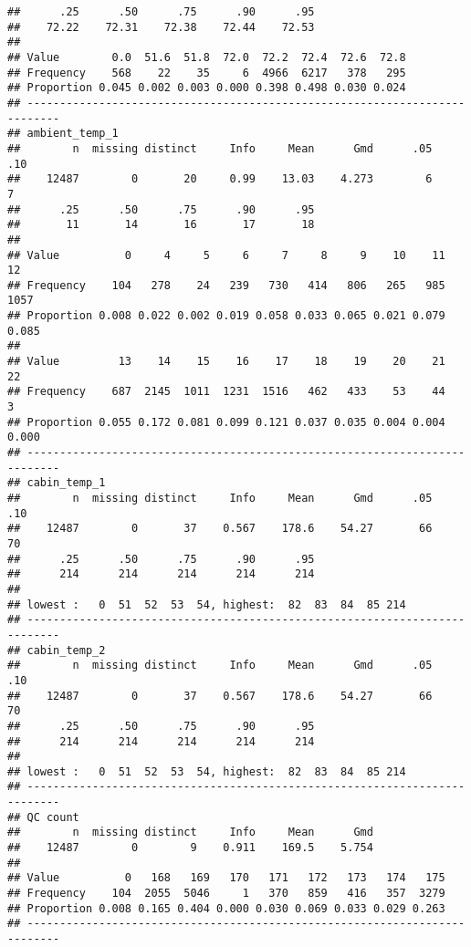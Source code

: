 \documentclass[]{article}
\begin{document}
\begin{verbatim}
##      .25      .50      .75      .90      .95 
##    72.22    72.31    72.38    72.44    72.53 
##                                                           
## Value        0.0  51.6  51.8  72.0  72.2  72.4  72.6  72.8
## Frequency    568    22    35     6  4966  6217   378   295
## Proportion 0.045 0.002 0.003 0.000 0.398 0.498 0.030 0.024
## ---------------------------------------------------------------------------
## ambient_temp_1 
##        n  missing distinct     Info     Mean      Gmd      .05      .10 
##    12487        0       20     0.99    13.03    4.273        6        7 
##      .25      .50      .75      .90      .95 
##       11       14       16       17       18 
##                                                                       
## Value          0     4     5     6     7     8     9    10    11    12
## Frequency    104   278    24   239   730   414   806   265   985  1057
## Proportion 0.008 0.022 0.002 0.019 0.058 0.033 0.065 0.021 0.079 0.085
##                                                                       
## Value         13    14    15    16    17    18    19    20    21    22
## Frequency    687  2145  1011  1231  1516   462   433    53    44     3
## Proportion 0.055 0.172 0.081 0.099 0.121 0.037 0.035 0.004 0.004 0.000
## ---------------------------------------------------------------------------
## cabin_temp_1 
##        n  missing distinct     Info     Mean      Gmd      .05      .10 
##    12487        0       37    0.567    178.6    54.27       66       70 
##      .25      .50      .75      .90      .95 
##      214      214      214      214      214 
## 
## lowest :   0  51  52  53  54, highest:  82  83  84  85 214
## ---------------------------------------------------------------------------
## cabin_temp_2 
##        n  missing distinct     Info     Mean      Gmd      .05      .10 
##    12487        0       37    0.567    178.6    54.27       66       70 
##      .25      .50      .75      .90      .95 
##      214      214      214      214      214 
## 
## lowest :   0  51  52  53  54, highest:  82  83  84  85 214
## ---------------------------------------------------------------------------
## QC count 
##        n  missing distinct     Info     Mean      Gmd 
##    12487        0        9    0.911    169.5    5.754 
##                                                                 
## Value          0   168   169   170   171   172   173   174   175
## Frequency    104  2055  5046     1   370   859   416   357  3279
## Proportion 0.008 0.165 0.404 0.000 0.030 0.069 0.033 0.029 0.263
## ---------------------------------------------------------------------------

\end{verbatim}
\end{document}
